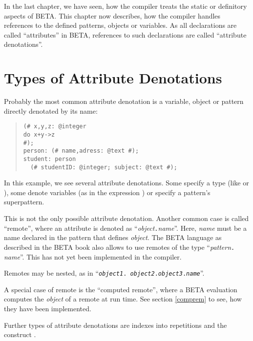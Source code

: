 In the last chapter, we have seen, how the compiler treats the
static or definitory aspects of BETA.  This chapter now
describes, how the compiler handles references to the defined
patterns, objects or variables.  As all declarations are
called ``attributes'' in BETA, references to such declarations
are called ``attribute denotations''.

\section{Types of Attribute Denotations}
Probably the most common attribute denotation is a variable,
object or pattern directly denotated by its name:
\begin{quote}\begin{verbatim}(# x,y,z: @integer
do x+y->z
#);
person: (# name,adress: @text #);
student: person
  (# studentID: @integer; subject: @text #);
\end{verbatim}\end{quote}
In this example, we see several attribute denotations.  Some
specify a type (like  or ), some denote
variables (as in the expression ) or specify a
pattern's superpattern.

This is not the only possible attribute denotation.  Another
common case is called ``remote'', where an attribute is denoted
as ``{\it object\/}{\tt .}{\it name\/}''.  Here, {\it name\/}
must be a name declared in the pattern that defines {\it
object\/}.  The BETA language as described in the BETA book also
allows to use remotes of the type ``{\it pattern\/}{\tt .}{\it
name\/}''.  This has not yet been implemented in the compiler.

Remotes may be nested, as in ``{\tt {\it object1\/}.{\it
object2\/}.{\it object3\/}.{\it name\/}}''.

A special case of remote is the ``computed remote'', where a BETA
evaluation computes the {\it object\/} of a remote at run time.
See section \ref{comprem} to see, how they have been implemented.

Further types of attribute denotations are indexes into
repetitions and the construct .
